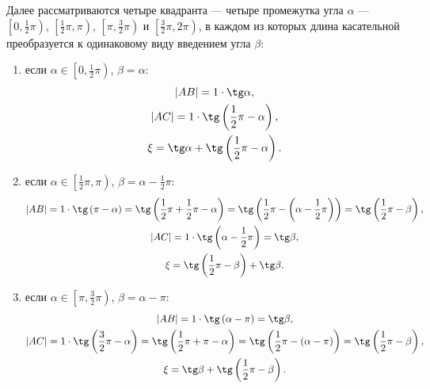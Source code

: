 \documentclass[12pt,a4paper]{article}
\begin{document}
    Далее рассматриваются четыре квадранта --- четыре промежутка угла $\alpha$ --- $\left [ 0, \frac{1}{2} \pi \right )$, $\left [ \frac{1}{2} \pi, \pi \right )$,
    $\left [ \pi, \frac{3}{2} \pi \right )$ и $\left [ \frac{3}{2} \pi, 2 \pi \right )$, в каждом из которых длина касательной преобразуется к одинаковому виду введением
    угла $\beta$:
    \begin{enumerate}
        \item если $\alpha \in \left [ 0, \frac{1}{2} \pi \right )$, $\beta = \alpha$:
        \begin{gather}
            \modulus{AB} = 1 \cdot \tg \alpha, \\
            \modulus{AC} = 1 \cdot \tg \left ( \frac{1}{2} \pi - \alpha \right ) , \\
            \xi = \tg \alpha + \tg \left ( \frac{1}{2} \pi - \alpha \right ).
        \end{gather}

        \item если $\alpha \in \left [ \frac{1}{2} \pi, \pi \right )$, $\beta = \alpha - \frac{1}{2} \pi$:
        \begin{gather}
            \modulus{AB} = 1 \cdot \tg \left ( \pi - \alpha \right ) = \tg \left ( \frac{1}{2} \pi + \frac{1}{2} \pi - \alpha \right ) = \tg \left ( \frac{1}{2} \pi - \left ( \alpha - \frac{1}{2} \pi \right ) \right ) = \tg \left ( \frac{1}{2} \pi - \beta \right ), \\
            \modulus{AC} = 1 \cdot \tg \left ( \alpha - \frac{1}{2} \pi \right ) = \tg \beta , \notag \\
            \xi = \tg \left ( \frac{1}{2} \pi - \beta \right ) + \tg \beta.
        \end{gather}

        \item если $\alpha \in \left [ \pi, \frac{3}{2} \pi \right )$, $\beta = \alpha - \pi$:
        \begin{gather}
            \modulus{AB} = 1 \cdot \tg \left ( \alpha - \pi \right ) = \tg \beta, \\
            \modulus{AC} = 1 \cdot \tg \left ( \frac{3}{2} \pi - \alpha \right ) = \tg \left ( \frac{1}{2} \pi + \pi - \alpha \right ) = \tg \left ( \frac{1}{2} \pi - \left ( \alpha - \pi \right ) \right ) = \tg \left ( \frac{1}{2} \pi - \beta \right ) , \\
            \xi = \tg \beta + \tg \left ( \frac{1}{2} \pi - \beta \right ).
        \end{gather}


\end{enumerate}
\end{document}
